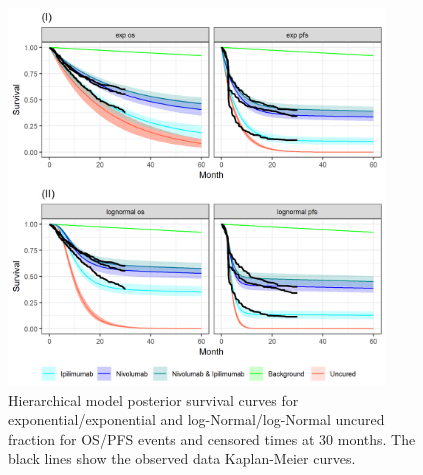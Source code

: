 \documentclass[AMA,STIX1COL]{WileyNJD-v2}
\begin{document}
\begin{figure}[!H]
\centering
\includegraphics[height=10cm, width=0.6\linewidth]{plot_S_grid_cf_hier_cpt_30m.png}
\caption{\label{fig:S_cutpoint_30mo_hier} Hierarchical model posterior survival curves for exponential/exponential and log-Normal/log-Normal uncured fraction for OS/PFS events and censored times at 30 months. The black lines show the observed data Kaplan-Meier curves.}
\end{figure}

\end{document}
